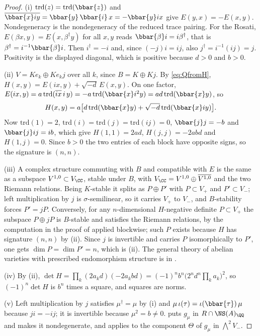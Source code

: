 \begin{proof}
(i) $\mathrm{trd}(z)=\mathrm{trd}(\bbar{z})$ and
$\overline{\bbar{x}iy}=\bbar{y}\,\bbar{i}\,x=-\bbar{y}ix$ give
$E(y,x)=-E(x,y)$. Nondegeneracy is the nondegeneracy of the reduced trace
pairing. For the Rosati, $E(\beta x,y)=E(x,\beta^{\dagger}y)$ for all $x,y$
reads $\bbar{\beta}i=i\beta^{\dagger}$, that is
$\beta^{\dagger}=i^{-1}\bbar{\beta}i$. Then $i^{\dagger}=-i$ and, since
$(-j)i=ij$, also $j^{\dagger}=i^{-1}(ij)=j$. Positivity is the displayed
diagonal, which is positive because $d>0$ and $b>0$.

(ii) $V=Ke_{k}\oplus Ke_{k}j$ over all $k$, since $B=K\oplus Kj$. By
\eqref{eq:QfromH}, $H(x,y)=E(ix,y)+\sqrt{-d}\,E(x,y)$. On one factor,
$E(ix,y)=a\,\mathrm{trd}(\overline{ix}\,i\,y)=-a\,\mathrm{trd}(\bbar{x}i^{2}y)
=ad\,\mathrm{trd}(\bbar{x}y)$, so
\[
  H(x,y)=a\bigl[d\,\mathrm{trd}(\bbar{x}y)+\sqrt{-d}\,\mathrm{trd}(\bbar{x}iy)\bigr].
\]
Now $\mathrm{trd}(1)=2$, $\mathrm{trd}(i)=\mathrm{trd}(j)=\mathrm{trd}(ij)=0$,
$\bbar{j}j=-b$ and $\bbar{j}ij=ib$, which give $H(1,1)=2ad$,
$H(j,j)=-2abd$ and $H(1,j)=0$. Since $b>0$ the two entries of each block have
opposite signs, so the signature is $(n,n)$.

(iii) A complex structure commuting with $B$ and compatible with $E$ is the
same as a subspace $V^{1,0}\subset V_{\CC}$, stable under $B$, with
$V_{\CC}=V^{1,0}\oplus\overline{V^{1,0}}$ and the two Riemann relations. Being
$K$-stable it splits as $P\oplus P'$ with $P\subset V_{+}$ and
$P'\subset V_{-}$; left multiplication by $j$ is $\sigma$-semilinear, so it
carries $V_{+}$ to $V_{-}$, and $B$-stability forces $P'=jP$. Conversely, for
any $n$-dimensional $H$-negative definite $P\subset V_{+}$ the subspace
$P\oplus jP$ is $B$-stable and satisfies the Riemann relations, by the
computation in the proof of  applied blockwise; such $P$
exists because $H$ has signature $(n,n)$ by (ii). Since $j$ is invertible and
carries $P$ isomorphically to $P'$, one gets $\dim P=\dim P'=n$, which is
(ii). The general theory of abelian varieties with
prescribed endomorphism structure is in \cite[Ch.~9]{BL04}.

(iv) By (ii), $\det H=\prod_{k}(2a_{k}d)(-2a_{k}bd)=(-1)^{n}b^{n}\bigl(2^{n}d^{n}
\prod_{k}a_{k}\bigr)^{2}$, so $(-1)^{n}\det H$ is $b^{n}$ times a square, and
squares are norms.

(v) Left multiplication by $j$ satisfies $\mu^{\dagger}=\mu$ by (i) and
$\mu\,\iota(\tau)=\iota(\bbar{\tau})\,\mu$ because $ji=-ij$; it is invertible
because $\mu^{2}=b\ne0$.  puts $g_{\mu}$ in
$R\cap\NS(A)_{\QQ}$ and makes it nondegenerate, and
 applies to the component $\Theta$ of $g_{\mu}$ in
$\bigwedge^{2}V_{-}$.
\end{proof}

